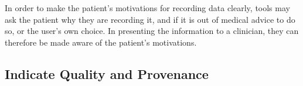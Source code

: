 \documentclass{sigchi}
\begin{document}
In order to make the patient's motivations for recording data clearly, tools may ask the patient why they are recording it, and if it is out of medical advice to do so, or the user's own choice. In presenting the information to a clinician, they can therefore be made aware of the patient's motivations.




\subsection{Indicate Quality and Provenance}



\end{document}
